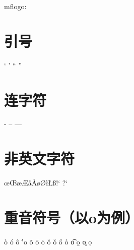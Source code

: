 \documentclass{article}
\begin{document}
	mflogo: \METAFONT{}	\MF{}	\MP{}
	\section{引号}
	` ' `` ''
	\section{连字符}
	-	--	---
	\section{非英文字符}
	\oe	\OE	\ae	\AE	\aa	\AA	\o	\O	\l	\L	\ss	\SS	!`	?`
	\section{重音符号（以o为例）}
	\`o	\'o	\^o	\''o	\~o	\=o	\.o	\u{o}	\v{o}	\H{o}	\r{o}	\t{o}	\b{o}	\c{o}	\d{o}
\end{document}
